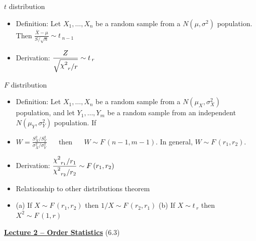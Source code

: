 \documentclass{article}
\newcommand{\bu}[1]{\textbf{\ul{#1}}}				%
\newcommand{\follow}[1]{\sim \text{#1}\,}		%
\newcommand{\vecn}[2]{#1_1, \ldots, #1_{#2}}	%
\newcommand{\chisq}{\raisebox{2pt}{$\chi^2$}}		%
\begin{document}
\newpage

$t$ distribution
\begin{itemize}
    \item Definition: Let $\vecn{X}{n}$ be a random sample from a $N(\mu, \sigma^2)$ population. Then $\displaystyle \frac{\bar{X} - \mu}{S / \sqrt{n}} \follow{$t$}_{n-1}$
    \item Derivation: $\displaystyle \frac{Z}{\sqrt{\chisq_r / r}} \follow{$t$}_r$
\end{itemize}\bigskip

$F$ distribution
\begin{itemize}
    \item Definition: Let $\vecn{X}{n}$ be a random sample from a $N(\mu_X, \sigma^2_X)$ population, and let $\vecn{Y}{m}$ be a random sample from an independent $N(\mu_Y, \sigma^2_Y)$ population. If
    \item[] $\displaystyle W = \frac{S^2_X / S^2_Y}{\sigma^2_X / \sigma^2_Y} \hspace{20pt} \text{then} \hspace{20pt} W \follow{$F$}(n-1, m-1)$. In general, $W \follow{$F$}(r_1, r_2)$.
    \item Derivation: $\displaystyle \frac{\chisq_{r_1} / r_1}{\chisq_{r_2} / r_2} \follow{$F$}(r_1, r_2)$
    \item Relationship to other distributions theorem
    \item[] (a) If $X \follow{$F$}(r_1,r_2)$ then $1/X \follow{$F$}(r_2,r_1)$ \hspace{20pt} (b) If $X \follow{$t$}_r$ then $X^2 \follow{$F$}(1,r)$
\end{itemize}\bigskip

\vspace{50pt}

{\large \bu{Lecture 2 -- Order Statistics}} (6.3)\bigskip
\end{document}
